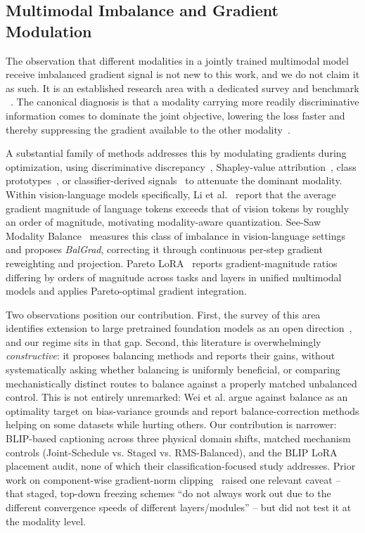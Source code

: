 \documentclass[journal]{IEEEtran}
\begin{document}
\subsection{Multimodal Imbalance and Gradient Modulation}
\label{sec:related-gradient}
The observation that different modalities in a jointly trained
multimodal model receive imbalanced gradient signal is not new to
this work, and we do not claim it as such. It is an established
research area with a dedicated survey and benchmark
~\cite{balancebenchmark2025}. The canonical diagnosis is that a
modality carrying more readily discriminative information comes
to dominate the joint objective, lowering the loss faster and
thereby suppressing the gradient available to the other
modality~\cite{peng2022ogm,wei2024onthefly}.

A substantial family of methods addresses this by modulating
gradients during optimization, using discriminative
discrepancy~\cite{peng2022ogm,wei2024onthefly}, Shapley-value
attribution~\cite{li2023agm}, class
prototypes~\cite{fan2023pmr}, or classifier-derived
signals~\cite{guo2024cggm} to attenuate the dominant modality.
Within vision-language models specifically, Li et
al.~\cite{li2025mbq} report that the average gradient magnitude of
language tokens exceeds that of vision tokens by roughly an order
of magnitude, motivating modality-aware quantization. See-Saw
Modality Balance~\cite{gim2025seesaw} measures this class of imbalance in vision-language settings and proposes \emph{BalGrad}, correcting it through continuous per-step gradient reweighting and projection. Pareto LoRA~\cite{paretolora2026} reports gradient-magnitude ratios differing by orders of magnitude across tasks and layers in unified multimodal models and applies Pareto-optimal gradient integration.

Two observations position our contribution. First, the survey of this area identifies extension to large pretrained foundation models as an open direction~\cite{balancebenchmark2025}, and our regime sits in that gap. Second, this literature is overwhelmingly
\emph{constructive}: it proposes balancing methods and reports their gains, without systematically asking whether balancing is uniformly beneficial, or comparing mechanistically distinct routes to balance against a properly matched unbalanced control. This is not entirely unremarked: Wei et al. \cite{wei2025improving} argue against balance as an optimality target on bias-variance grounds and report balance-correction methods helping on some datasets while hurting others. Our contribution is narrower: BLIP-based captioning across three physical domain shifts, matched mechanism controls (Joint-Schedule vs. Staged vs. RMS-Balanced), and the BLIP LoRA placement audit, none of which their classification-focused study addresses. Prior work on component-wise gradient-norm clipping~\cite{gnc2022} raised one relevant caveat -- that staged, top-down freezing schemes ``do not always work out due to the different convergence speeds of different layers/modules'' -- but did not test it at the modality level.
\end{document}
